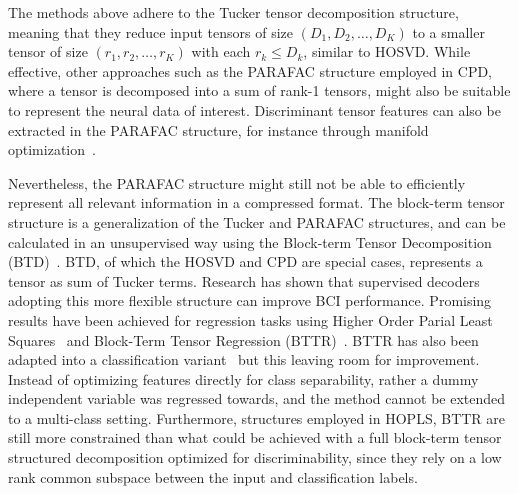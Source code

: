 The methods above adhere to the Tucker tensor decomposition
structure,
meaning that they reduce input tensors of size
$(D_1,D_2,\ldots,D_K)$ to a smaller tensor of size $(r_1,r_2,\ldots,r_K)$ with
each $r_k\leq D_k$, similar to HOSVD.
While effective, other approaches such as the PARAFAC structure employed in
CPD, where a tensor is decomposed into a sum of rank-1 tensors,
might also be suitable to represent the neural data of interest.
Discriminant tensor features can also be extracted
in the PARAFAC structure, for instance through manifold
optimization~\cite{Froelich2018}.

Nevertheless, the PARAFAC structure might still not be able to
efficiently represent all relevant information in a compressed format.
The block-term tensor structure is a generalization of the Tucker and
PARAFAC structures, and can be calculated in an unsupervised way using
the Block-term Tensor Decomposition
(BTD)~\cite{DeLathauwer2008,DeLathauwer2008a,DeLathauwer2008b,Rontogiannis2021}.
BTD, of which the HOSVD and CPD are special cases,
represents a tensor as sum of Tucker terms.
Research has shown that supervised decoders adopting this more flexible structure
can improve BCI performance.
Promising results have been achieved for regression tasks using
Higher Order Parial Least Squares~\cite{Camarrone2018} and Block-Term Tensor
Regression (BTTR)~\cite{Faes2022,Faes2022b}.
BTTR has also been adapted into a classification variant~\cite{Camarrone2021}
but this leaving room for improvement.
Instead of optimizing features directly for class separability, rather a dummy
independent variable was regressed towards, and the method
cannot be extended to a multi-class setting.
Furthermore, structures employed in HOPLS, BTTR are still more constrained than
what could be achieved with a full block-term tensor structured decomposition
optimized for discriminability, since they rely on a low rank common subspace
between the input and classification labels.

